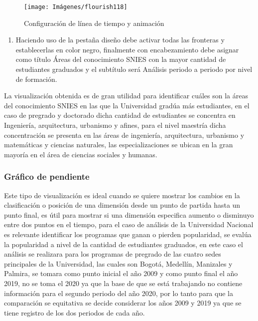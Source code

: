 \documentclass[
]{book}
\providecommand{\tightlist}{%
  \setlength{\itemsep}{0pt}\setlength{\parskip}{0pt}}
\begin{document}
\begin{figure}

{\centering \texttt{[image: Imágenes/flourish118]} 

}

\caption{Configuración de línea de tiempo y animación}\label{fig:paso9carrerabarrasflourish-fig}
\end{figure}

\begin{enumerate}
\def\labelenumi{\arabic{enumi}.}
\setcounter{enumi}{9}
\tightlist
\item
  Haciendo uso de la pestaña diseño debe activar todas las fronteras y establecerlas en color negro, finalmente con encabezamiento debe asignar como título Áreas del conocimiento SNIES con la mayor cantidad de estudiantes graduados y el subtítulo será Análisis periodo a periodo por nivel de formación.
\end{enumerate}

La visualización obtenida es de gran utilidad para identificar cuáles son la áreas del conocimiento SNIES en las que la Universidad gradúa más estudiantes, en el caso de pregrado y doctorado dicha cantidad de estudiantes se concentra en Ingeniería, arquitectura, urbanismo y afines, para el nivel maestría dicha concentración se presenta en las áreas de ingeniería, arquitectura, urbanismo y matemáticas y ciencias naturales, las especializaciones se ubican en la gran mayoría en el área de ciencias sociales y humanas.

\hypertarget{graficopendienteflourish}{%
\subsubsection{Gráfico de pendiente}\label{graficopendienteflourish}}

Este tipo de visualización es ideal cuando se quiere mostrar los cambios en la clasificación o posición de una dimensión desde un punto de partida hasta un punto final, es útil para mostrar si una dimensión especifica aumento o disminuyo entre dos puntos en el tiempo, para el caso de análisis de la Universidad Nacional es relevante identificar los programas que ganan o pierden popularidad, se evalúa la popularidad a nivel de la cantidad de estudiantes graduados, en este caso el análisis se realizara para los programas de pregrado de las cuatro sedes principales de la Universidad, las cuales son Bogotá, Medellín, Manizales y Palmira, se tomara como punto inicial el año 2009 y como punto final el año 2019, no se toma el 2020 ya que la base de que se está trabajando no contiene información para el segundo periodo del año 2020, por lo tanto para que la comparación se equitativa se decide considerar los años 2009 y 2019 ya que se tiene registro de los dos periodos de cada año.
\end{document}
